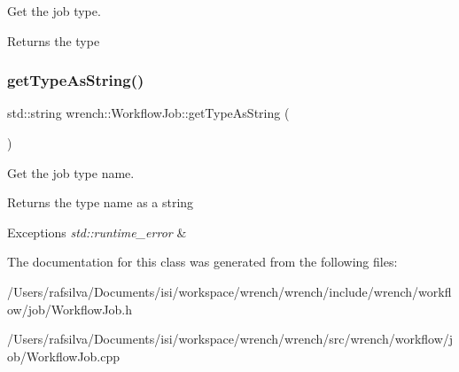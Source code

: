 Get the job type. 

\begin{DoxyReturn}{Returns}
the type 
\end{DoxyReturn}
\mbox{\label{classwrench_1_1_workflow_job_a8162ab7d79c56373d610f8cb7b3f1f07}} 
\subsubsection{\texorpdfstring{get\+Type\+As\+String()}{getTypeAsString()}}
{\footnotesize\ttfamily std\+::string wrench\+::\+Workflow\+Job\+::get\+Type\+As\+String (\begin{DoxyParamCaption}{ }\end{DoxyParamCaption})}



Get the job type name. 

\begin{DoxyReturn}{Returns}
the type name as a string
\end{DoxyReturn}

\begin{DoxyExceptions}{Exceptions}
{\em std\+::runtime\+\_\+error} & \\
\hline
\end{DoxyExceptions}


The documentation for this class was generated from the following files\+:\begin{DoxyCompactItemize}
\item 
/\+Users/rafsilva/\+Documents/isi/workspace/wrench/wrench/include/wrench/workflow/job/Workflow\+Job.\+h\item 
/\+Users/rafsilva/\+Documents/isi/workspace/wrench/wrench/src/wrench/workflow/job/Workflow\+Job.\+cpp\end{DoxyCompactItemize}
